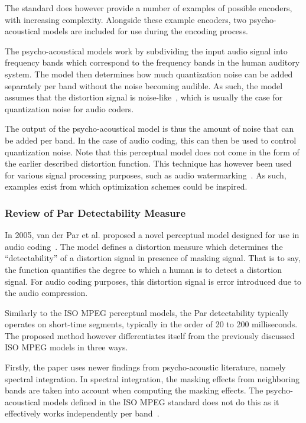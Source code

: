 The standard does however provide a number of examples of possible encoders, with increasing complexity.
Alongside these example encoders, two psycho-acoustical models are included for use during the encoding process. 

The psycho-acoustical models work by subdividing the input audio signal into frequency bands which correspond to the 
frequency bands in the human auditory system.
The model then determines how much quantization noise can be added separately per band without the noise becoming audible.
As such, the model assumes that the distortion signal is noise-like~\cite{van2005perceptual}, which is usually
the case for quantization noise for audio coders.

The output of the psycho-acoustical model is thus the amount of noise that can be added per band.
In the case of audio coding, this can then be used to control quantization noise.
Note that this perceptual model does not come in the form of the earlier described distortion function.
This technique has however been used for various signal processing purposes, 
such as audio watermarking~\cite{taal2012low}.
As such, examples exist from which optimization schemes could be inspired.

\subsubsection{Review of Par Detectability Measure}
In 2005, van der Par et al. proposed a novel perceptual model designed for use in audio coding~\cite{van2005perceptual}.
The model defines a distortion measure which determines the ``detectability'' of a distortion signal 
in presence of  masking signal.
That is to say, the function quantifies the degree to which a human is to detect a distortion signal.
For audio coding purposes, this distortion signal is error introduced due to the audio compression.

Similarly to the ISO MPEG perceptual models, the Par detectability typically operates on short-time segments, typically in the order of 20 to 200 milliseconds.
The proposed method however differentiates itself from the previously discussed ISO MPEG models in three ways.

Firstly, the paper uses newer findings from psycho-acoustic literature, namely spectral integration.
In spectral integration, the masking effects from neighboring bands are taken into account when computing the 
masking effects.
The psycho-acoustical models defined in the ISO MPEG standard does not do this as it effectively 
works independently per band~\cite{taal2012low}.

